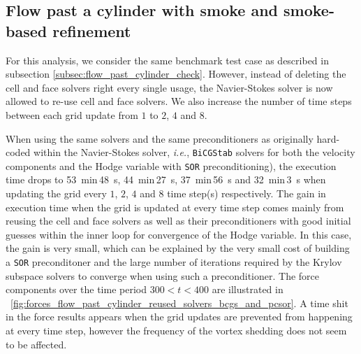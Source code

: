 \documentclass[11pt, a4paper]{article}
\newcommand{\fig}{\figurename \ }
\theoremstyle{remark}
\begin{document}
\subsection{Flow past a cylinder with smoke and smoke-based refinement}
\label{subsec:assessment_cylinder_and_smoke}
For this analysis, we consider the same benchmark test case as described in subsection \ref{subsec:flow_past_cylinder_check}. However, instead of deleting the cell and face solvers right every single usage, the Navier-Stokes solver is now allowed to re-use cell and face solvers. We also increase the number of time steps between each grid update from $1$ to $2$, $4$ and $8$. 

When using the same solvers and the same preconditioners as originally hard-coded within the Navier-Stokes solver, \textit{i.e.}, \verb|BiCGStab| solvers for both the velocity components and the Hodge variable with \verb|SOR| preconditioning), the execution time drops to \SI{53}{\minute}\,\SI{48}{\second}, \SI{44}{\minute}\,\SI{27}{\second}, \SI{37}{\minute}\,\SI{56}{\second} and \SI{32}{\minute}\,\SI{3}{\second} when updating the grid every $1$, $2$, $4$ and $8$ time step(s) respectively. The gain in execution time when the grid is updated at every time step comes mainly from reusing the cell and face solvers as well as their preconditioners with good initial guesses within the inner loop for convergence of the Hodge variable. In this case, the gain is very small, which can be explained by the very small cost of building a \verb|SOR| preconditoner and the large number of iterations required by the Krylov subspace solvers to converge when using such a preconditioner. The force components over the time period $300 < t < 400$ are illustrated in \fig \ref{fig:forces_flow_past_cylinder_reused_solvers_bcgs_and_pcsor}. A time shit in the force results appears when the grid updates are prevented from happening at every time step, however the frequency of the vortex shedding does not seem to be affected.
\end{document}
